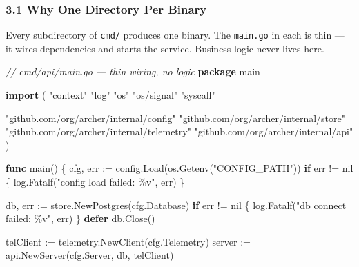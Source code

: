 \documentclass[
]{article}
\newenvironment{Shaded}{}{}
\newcommand{\CommentTok}[1]{\textcolor[rgb]{0.38,0.63,0.69}{\textit{#1}}}
\newcommand{\ControlFlowTok}[1]{\textcolor[rgb]{0.00,0.44,0.13}{\textbf{#1}}}
\newcommand{\KeywordTok}[1]{\textcolor[rgb]{0.00,0.44,0.13}{\textbf{#1}}}
\newcommand{\NormalTok}[1]{#1}
\newcommand{\OperatorTok}[1]{\textcolor[rgb]{0.40,0.40,0.40}{#1}}
\newcommand{\OtherTok}[1]{\textcolor[rgb]{0.00,0.44,0.13}{#1}}
\newcommand{\StringTok}[1]{\textcolor[rgb]{0.25,0.44,0.63}{#1}}
\begin{document}
\hypertarget{why-one-directory-per-binary}{%
\subsubsection{3.1 Why One Directory Per
Binary}\label{why-one-directory-per-binary}}

Every subdirectory of \texttt{cmd/} produces one binary. The
\texttt{main.go} in each is thin --- it wires dependencies and starts
the service. Business logic never lives here.

\begin{Shaded}
\begin{Highlighting}[]
\CommentTok{// cmd/api/main.go — thin wiring, no logic}
\KeywordTok{package}\NormalTok{ main}

\KeywordTok{import} \OperatorTok{(}
    \StringTok{"context"}
    \StringTok{"log"}
    \StringTok{"os"}
    \StringTok{"os/signal"}
    \StringTok{"syscall"}

    \StringTok{"github.com/org/archer/internal/config"}
    \StringTok{"github.com/org/archer/internal/store"}
    \StringTok{"github.com/org/archer/internal/telemetry"}
    \StringTok{"github.com/org/archer/internal/api"}
\OperatorTok{)}

\KeywordTok{func}\NormalTok{ main}\OperatorTok{()} \OperatorTok{\{}
\NormalTok{    cfg}\OperatorTok{,}\NormalTok{ err }\OperatorTok{:=}\NormalTok{ config}\OperatorTok{.}\NormalTok{Load}\OperatorTok{(}\NormalTok{os}\OperatorTok{.}\NormalTok{Getenv}\OperatorTok{(}\StringTok{"CONFIG\_PATH"}\OperatorTok{))}
    \ControlFlowTok{if}\NormalTok{ err }\OperatorTok{!=} \OtherTok{nil} \OperatorTok{\{}
\NormalTok{        log}\OperatorTok{.}\NormalTok{Fatalf}\OperatorTok{(}\StringTok{"config load failed: \%v"}\OperatorTok{,}\NormalTok{ err}\OperatorTok{)}
    \OperatorTok{\}}

\NormalTok{    db}\OperatorTok{,}\NormalTok{ err }\OperatorTok{:=}\NormalTok{ store}\OperatorTok{.}\NormalTok{NewPostgres}\OperatorTok{(}\NormalTok{cfg}\OperatorTok{.}\NormalTok{Database}\OperatorTok{)}
    \ControlFlowTok{if}\NormalTok{ err }\OperatorTok{!=} \OtherTok{nil} \OperatorTok{\{}
\NormalTok{        log}\OperatorTok{.}\NormalTok{Fatalf}\OperatorTok{(}\StringTok{"db connect failed: \%v"}\OperatorTok{,}\NormalTok{ err}\OperatorTok{)}
    \OperatorTok{\}}
    \ControlFlowTok{defer}\NormalTok{ db}\OperatorTok{.}\NormalTok{Close}\OperatorTok{()}

\NormalTok{    telClient }\OperatorTok{:=}\NormalTok{ telemetry}\OperatorTok{.}\NormalTok{NewClient}\OperatorTok{(}\NormalTok{cfg}\OperatorTok{.}\NormalTok{Telemetry}\OperatorTok{)}
\NormalTok{    server }\OperatorTok{:=}\NormalTok{ api}\OperatorTok{.}\NormalTok{NewServer}\OperatorTok{(}\NormalTok{cfg}\OperatorTok{.}\NormalTok{Server}\OperatorTok{,}\NormalTok{ db}\OperatorTok{,}\NormalTok{ telClient}\OperatorTok{)}


\end{Highlighting}
\end{Shaded}
\end{document}
